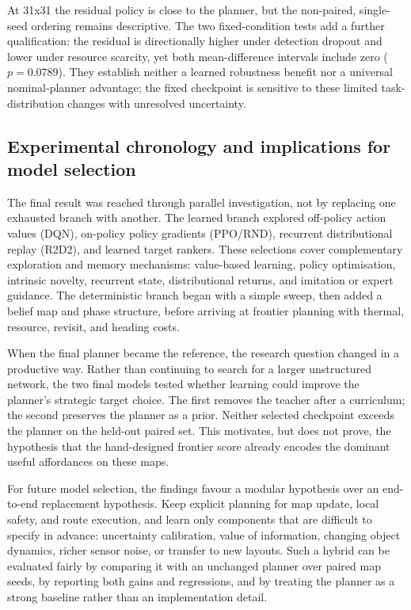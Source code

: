 \documentclass[10pt,letterpaper]{article}
\begin{document}
At 31x31 the residual policy is close to the planner, but the non-paired,
single-seed ordering remains descriptive. The two fixed-condition tests add a
further qualification: the residual is directionally higher under detection
dropout and lower under resource scarcity, yet both mean-difference intervals
include zero ($p=0.0789$). They establish neither a learned robustness benefit
nor a universal nominal-planner advantage; the fixed checkpoint is sensitive
to these limited task-distribution changes with unresolved uncertainty.

\subsection{Experimental chronology and implications for model selection}

The final result was reached through parallel investigation, not by replacing
one exhausted branch with another. The learned branch explored off-policy
action values (DQN), on-policy policy gradients (PPO/RND), recurrent
distributional replay (R2D2), and learned target rankers. These selections
cover complementary exploration and memory mechanisms: value-based learning,
policy optimisation, intrinsic novelty, recurrent state, distributional
returns, and imitation or expert guidance. The deterministic branch began
with a simple sweep, then added a belief map and phase structure, before
arriving at frontier planning with thermal, resource, revisit, and heading
costs.

When the final planner became the reference, the research question changed in
a productive way. Rather than continuing to search for a larger unstructured
network, the two final models tested whether learning could improve the
planner's strategic target choice. The first removes the teacher after a
curriculum; the second preserves the planner as a prior. Neither selected
checkpoint exceeds the planner on the held-out paired set. This motivates, but
does not prove, the hypothesis that the hand-designed frontier score already
encodes the dominant useful affordances on these maps.

For future model selection, the findings favour a modular hypothesis over an
end-to-end replacement hypothesis. Keep explicit planning for map update,
local safety, and route execution, and learn only components that are difficult
to specify in advance: uncertainty calibration, value of information, changing
object dynamics, richer sensor noise, or transfer to new layouts. Such a hybrid can
be evaluated fairly by comparing it with an unchanged planner over paired map
seeds, by reporting both gains and regressions, and by treating the planner as
a strong baseline rather than an implementation detail.
\end{document}
